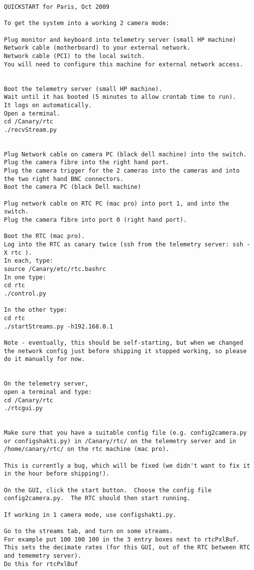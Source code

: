 \begin{verbatim}
QUICKSTART for Paris, Oct 2009

To get the system into a working 2 camera mode:

Plug monitor and keyboard into telemetry server (small HP machine)
Network cable (motherboard) to your external network.
Network cable (PCI) to the local switch.
You will need to configure this machine for external network access.


Boot the telemetry server (small HP machine).
Wait until it has booted (5 minutes to allow crontab time to run).
It logs on automatically.
Open a terminal.
cd /Canary/rtc
./recvStream.py


Plug Network cable on camera PC (black dell machine) into the switch.
Plug the camera fibre into the right hand port.
Plug the camera trigger for the 2 cameras into the cameras and into
the two right hand BNC connectors.
Boot the camera PC (black Dell machine)

Plug network cable on RTC PC (mac pro) into port 1, and into the switch.
Plug the camera fibre into port 0 (right hand port).

Boot the RTC (mac pro).
Log into the RTC as canary twice (ssh from the telemetry server: ssh -X rtc ).
In each, type:
source /Canary/etc/rtc.bashrc
In one type:
cd rtc
./control.py

In the other type:
cd rtc
./startStreams.py -h192.168.0.1

Note - eventually, this should be self-starting, but when we changed
the network config just before shipping it stopped working, so please
do it manually for now.


On the telemetry server, 
open a terminal and type:
cd /Canary/rtc
./rtcgui.py


Make sure that you have a suitable config file (e.g. config2camera.py
or configshakti.py) in /Canary/rtc/ on the telemetry server and in
/home/canary/rtc/ on the rtc machine (mac pro).  

This is currently a bug, which will be fixed (we didn't want to fix it
in the hour before shipping!).

On the GUI, click the start button.  Choose the config file
config2camera.py.  The RTC should then start running.

If working in 1 camera mode, use configshakti.py.

Go to the streams tab, and turn on some streams.  
For example put 100 100 100 in the 3 entry boxes next to rtcPxlBuf.
This sets the decimate rates (for this GUI, out of the RTC between RTC
and tememetry server).
Do this for rtcPxlBuf


\end{verbatim}
